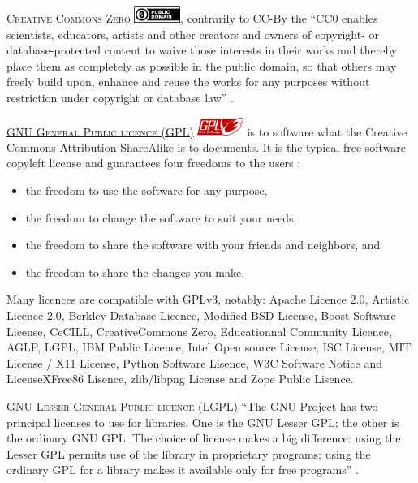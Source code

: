 \vspace{0.4cm}

\noindent \label{lcc0}  \textsc{\href{https://creativecommons.org/}{Creative Commons Zero}} \includegraphics[width=15mm]{./images/CC0-88x31.png}, contrarily to CC-By the ``CC0 enables scientists, educators, artists and other creators and owners of copyright- or database-protected content to waive those interests in their works and thereby place them as completely as possible in the public domain, so that others may freely build upon, enhance and reuse the works for any purposes without restriction under copyright or database law'' \cite{creativecommons.org_creative_2015}.

\noindent {} \textsc{\href{http://www.gnu.org/licenses/gpl.html}{GNU General Public licence (GPL)}} \includegraphics[width=15mm]{./images/gplv3-127x51.png} is to software what the Creative Commons Attribution-ShareAlike is to documents. It is the typical free software copyleft license and guarantees four freedoms to the users \cite{fsf_gpl_2105}:
\begin{itemize}
\item the freedom to use the software for any purpose,
\item the freedom to change the software to suit your needs,
\item the freedom to share the software with your friends and neighbors, and
\item the freedom to share the changes you make.
\end{itemize}

Many licences are compatible with GPLv3, notably: Apache Licence 2.0, Artistic Licence 2.0, Berkley Database Licence, Modified BSD License, Boost Software License, CeCILL, CreativeCommons Zero, Educationnal Community Licence, AGLP, LGPL, IBM Public Licence, Intel Open source License, ISC License, MIT License / X11 License, Python Software Lisence, W3C Software Notice and LicenseXFree86 Lisence, zlib/libpng License and Zope Public Lisence.  \cite{wikipedia_comparison_2015}

\vspace{0.4cm}

\noindent {} \textsc{\href{http://www.gnu.org/licenses/lgpl.html}{GNU Lesser General Public licence (LGPL)}} ``The GNU Project has two principal licenses to use for libraries. One is the GNU Lesser GPL; the other is the ordinary GNU GPL. The choice of license makes a big difference: using the Lesser GPL permits use of the library in proprietary programs; using the ordinary GPL for a library makes it available only for free programs'' \cite{fsf_lgpl_2015}.

